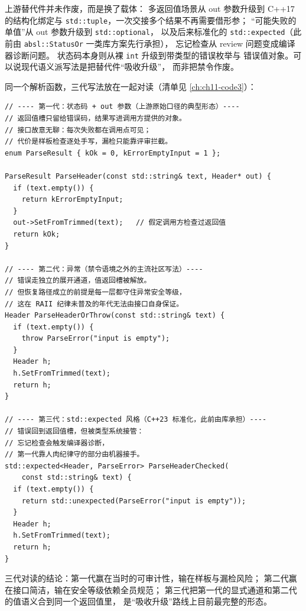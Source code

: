 \documentclass[12pt,a4paper,fontset=fandol]{ctexbook}
\newcommand{\cpp}[1]{C++#1}
\newcommand{\Tp}[1]{\texttt{#1}}
\newcommand{\Bk}{\discretionary{}{}{}}
\begin{document}
\begin{note}[title={这些替代在 \cpp{11} 之后各自被语言特性升级}]
上游替代件并未作废，而是换了载体：
多返回值场景从 out 参数升级到 \cpp{17} 的结构化绑定与
\Tp{std::tuple}，一次交接多个结果不再需要借形参；
``可能失败的单值''从 out 参数升级到 \Tp{std::optional}，
以及后来标准化的 \Tp{std::expected}（此前由
\Tp{absl::{\Bk}StatusOr} 一类库方案先行承担），
忘记检查从 review 问题变成编译器诊断问题。
状态码本身则从裸 \Tp{int} 升级到带类型的错误枚举与
错误值对象。可以说现代语义派写法是把替代件``吸收升级''，
而非把禁令作废。
\end{note}

同一个解析函数，三代写法放在一起对读（清单见
\ref{ch:ch11-code3}）：

\begin{lstlisting}[style=cppstyle,
  caption={同一错误处理的三代写法：状态码、异常、expected 风格},
  label={ch:ch11-code3}]
// ---- 第一代：状态码 + out 参数（上游原始口径的典型形态）----
// 返回值槽只留给错误码，结果写进调用方提供的对象。
// 接口故意无聊：每次失败都在调用点可见；
// 代价是样板检查逐处手写，漏检只能靠评审拦截。
enum ParseResult { kOk = 0, kErrorEmptyInput = 1 };

ParseResult ParseHeader(const std::string& text, Header* out) {
  if (text.empty()) {
    return kErrorEmptyInput;
  }
  out->SetFromTrimmed(text);   // 假定调用方检查过返回值
  return kOk;
}

// ---- 第二代：异常（禁令语境之外的主流社区写法）----
// 错误走独立的展开通道，值返回槽被解放。
// 但恢复路径成立的前提是每一层都守住异常安全等级，
// 这在 RAII 纪律未普及的年代无法由接口自身保证。
Header ParseHeaderOrThrow(const std::string& text) {
  if (text.empty()) {
    throw ParseError("input is empty");
  }
  Header h;
  h.SetFromTrimmed(text);
  return h;
}

// ---- 第三代：std::expected 风格（C++23 标准化，此前由库承担）----
// 错误回到返回值槽，但被类型系统接管：
// 忘记检查会触发编译器诊断，
// 第一代靠人肉纪律守的部分由机器接手。
std::expected<Header, ParseError> ParseHeaderChecked(
    const std::string& text) {
  if (text.empty()) {
    return std::unexpected(ParseError("input is empty"));
  }
  Header h;
  h.SetFromTrimmed(text);
  return h;
}
\end{lstlisting}

三代对读的结论：第一代赢在当时的可审计性，输在样板与漏检风险；
第二代赢在接口简洁，输在安全等级依赖全员规范；
第三代把第一代的显式通道和第二代的值语义合到同一个返回值里，
是``吸收升级''路线上目前最完整的形态。
\end{document}
